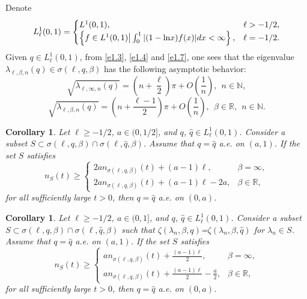 \documentclass[reqno,12pt,centertags]{amsart}
\renewcommand{\ln}{\text{\rm ln}}
\numberwithin{equation}{section}
\newtheorem{corollary}[theorem]{Corollary}
\theoremstyle{definition}
\begin{document}
Denote
\begin{align*}
L_{\ell}^{1}(0,1)=
\begin{cases}
L^1(0,1), &\ell>-1/2, \\
\left\{f \in L^1(0,1)\big|\int_0^1|(1-\ln x) f(x)|dx<\infty\right\}, &\ell=-1/2.
\end{cases}
\end{align*}
Given $q\in L_{\ell}^{1}(0, 1)$, from \eqref{e1.3}, \eqref{e1.4} and \eqref{e1.7}, one sees that the eigenvalue $\lambda_{\ell, \beta, n}(q)\in\sigma(\ell, q, \beta)$ has the following asymptotic behavior:
\begin{equation}\label{e5.4}
\sqrt{\lambda_{\ell, \infty, n}(q)}=\left(n+\frac{\ell}{2}\right) \pi+O\left(\frac{1}{n}\right), ~~n \in \mathbb{N},
\end{equation}
\begin{equation}\label{e5.5}
\sqrt{\lambda_{\ell, \beta, n}(q)}=\left(n+\frac{\ell-1}{2}\right) \pi+O\left(\frac{1}{n}\right), ~~\beta \in \mathbb{R}, 
~~n \in \mathbb{N}.
\end{equation}


\begin{corollary}\label{t5.3}
Let $\ell\geq-1/2$, $a \in(0,1/2]$, and $q$, $\hat{q}\in L_{\ell}^{1}(0,1)$. Consider a subset $S\subset\sigma(\ell,q,\beta)\cap\sigma(\ell,\hat{q},\beta)$. Assume that $q=\hat{q}$ a.e. on $(a, 1)$. If the set $S$ satisfies
\begin{equation}\label{e5.8}
n_S(t) \geq 
\begin{cases}
2a n_{\sigma(\ell, q, \beta)}(t)+(a-1)\ell,& \beta=\infty,\\
2a n_{\sigma(\ell, q, \beta)}(t)+(a-1)\ell-2a,&\beta\in\mathbb{R},
\end{cases}
\end{equation}
for all sufficiently large $t>0$, then $q=\hat{q}$ a.e. on $(0,a)$.
\end{corollary}

\begin{corollary}\label{t5.2}
Let $\ell\geq-1/2$, $a \in(0,1]$, and $q$, $\hat{q}\in L_{\ell}^{1}(0,1)$. Consider a subset $S\subset\sigma(\ell,q,\beta)\cap\sigma(\ell,\hat{q},\beta)$ such that 
$\zeta(\lambda_{n},\beta, q)$=$\zeta(\lambda_{n},\beta, \hat{q})$
for $\lambda_n \in S$. Assume that $q=\hat{q}$ a.e. on $(a, 1)$. If the set $S$ satisfies
\begin{equation}\label{e5.3}
n_S(t) \geq 
\begin{cases}
a n_{\sigma(\ell, q, \beta)}(t)+\frac{(a-1) \ell}{2},& \beta=\infty,\\
a n_{\sigma(\ell, q, \beta)}(t)+\frac{(a-1) \ell}{2}-\frac{a}{2},
&\beta\in\mathbb{R},
\end{cases}
\end{equation}
for all sufficiently large $t>0$, then $q=\hat{q}$ a.e. on $(0,a)$.
\end{corollary}
\end{document}
